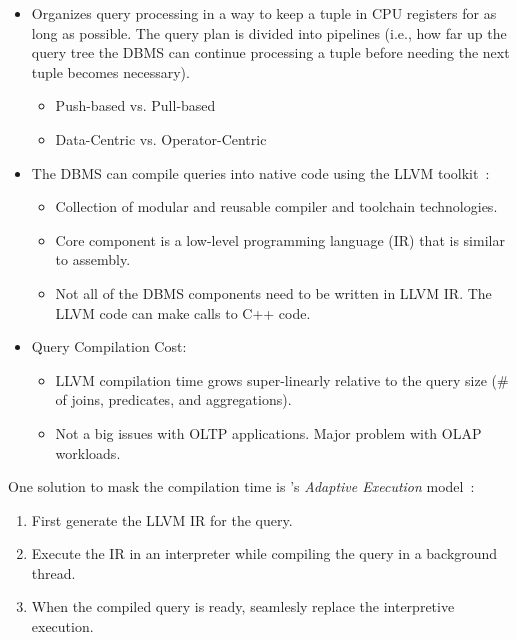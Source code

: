 \documentclass[11pt]{article}
\begin{document}
\begin{itemize}
    \item
    Organizes query processing in a way to keep a tuple in CPU registers for as long as 
    possible. The query plan is divided into pipelines (i.e., how far up the query tree 
    the DBMS can continue processing a tuple before needing the next tuple becomes necessary).
    \begin{itemize}
        \item
        Push-based vs. Pull-based
        
        \item
        Data-Centric vs. Operator-Centric
    \end{itemize}
    
    \item
    The DBMS can compile queries into native code using the LLVM toolkit~\cite{lattner04}:
    \begin{itemize}
        \item
        Collection of modular and reusable compiler and toolchain technologies.
        
        \item
        Core component is a low-level programming language (IR) that is similar to assembly.
        
        \item
        Not all of the DBMS components need to be written in LLVM IR. The LLVM code can 
        make calls to C++ code.
    \end{itemize}
    
    \item Query Compilation Cost:
    \begin{itemize}
        \item
        LLVM compilation time grows super-linearly relative to the query size (\# of joins, 
        predicates, and aggregations).
        
        \item
        Not a big issues with OLTP applications. Major problem with OLAP workloads.
    \end{itemize}
\end{itemize}
        
One solution to mask the compilation time is 's \textit{Adaptive Execution} 
model~\cite{kohn18}:
\begin{enumerate}
    \item
    First generate the LLVM IR for the query.
    
    \item
    Execute the IR in an interpreter while compiling the query in a background thread.
    
    \item
    When the compiled query is ready, seamlesly replace the interpretive execution.
\end{enumerate}
\end{document}

